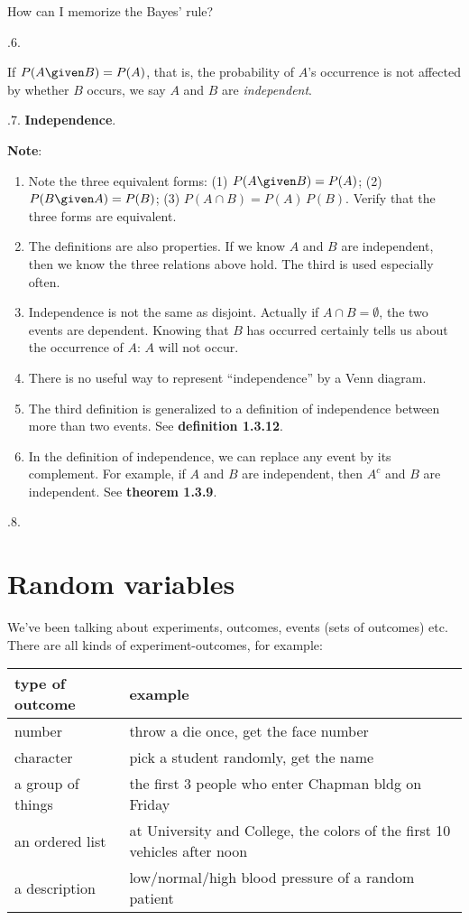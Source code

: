 \documentclass[12pt]{article}
\begin{document}
How can I memorize the Bayes' rule?

.6.

\hrulefill

If $P(A \given B) = P(A)$,
that is, the probability of $A$'s occurrence is not affected by whether
$B$ occurs, we say $A$ and $B$ are \emph{independent}.

.7. \textbf{Independence}.

\textbf{Note}:
\begin{enumerate}
\item
Note the three equivalent forms:
(1) $P(A \given B) = P(A)$;
(2) $P(B \given A) = P(B)$;
(3) $P(A \cap B) = P(A)\, P(B)$.
Verify that the three forms are equivalent.
\item
The definitions are also properties.
If we know $A$ and $B$ are independent,
then we know the three relations above hold.
The third is used especially often.
\item
Independence is not the same as disjoint.
Actually if $A \cap B = \emptyset$, the two events are
dependent. Knowing that $B$ has occurred certainly tells us about the
occurrence of $A$: $A$ will not occur.
\item
There is no useful way to represent ``independence'' by a Venn
diagram.
\item
The third definition is generalized to a definition of independence
between more than two events.
See \textbf{definition 1.3.12}.
\item
In the definition of independence, we can replace any event by its
complement. For example, if $A$ and $B$ are independent,
then $A^c$ and $B$ are independent.
See \textbf{theorem 1.3.9}.
\end{enumerate}


.8.


\section{Random variables}

We've been talking about experiments, outcomes, events (\ie sets of
outcomes) etc.
There are all kinds of experiment-outcomes,
for example:

\begin{tabular}{ll}
type of outcome & example\\ \hline
number & throw a die once, get the face number\\
character & pick a student randomly, get the name\\
a group of things & the first 3 people who enter Chapman bldg on Friday\\
an ordered list & at University and College, the colors of the first 10
vehicles after noon\\
a description & low/normal/high blood pressure of a random patient
\\ \hline
\end{tabular}
\end{document}
